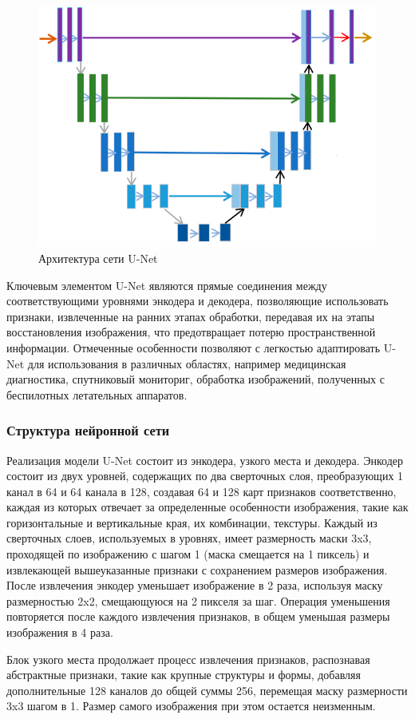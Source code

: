 \begin{figure}[h]
	\centering
	\includegraphics[width=0.7\linewidth]{images/unet}
	\caption{Архитектура сети U-Net}
	\label{fig:unet}
\end{figure}

Ключевым элементом U-Net являются прямые соединения между соответствующими уровнями энкодера и декодера, позволяющие использовать признаки, извлеченные на ранних этапах обработки, передавая их на этапы восстановления изображения, что предотвращает потерю пространственной информации. Отмеченные особенности позволяют с легкостью адаптировать U-Net для использования в различных областях, например медицинская диагностика, спутниковый мониториг, обработка изображений, полученных с беспилотных летательных аппаратов.

\subsubsection{Структура нейронной сети}

Реализация модели U-Net состоит из энкодера, узкого места и декодера. Энкодер состоит из двух уровней, содержащих по два сверточных слоя, преобразующих 1 канал в 64 и 64 канала в 128, создавая 64 и 128 карт признаков соответственно, каждая из которых отвечает за определенные особенности изображения, такие как горизонтальные и вертикальные края, их комбинации, текстуры. Каждый из сверточных слоев, используемых в уровнях, имеет размерность маски 3x3, проходящей по изображению с шагом 1 (маска смещается на 1 пиксель) и извлекающей вышеуказанные признаки с сохранением размеров изображения. После извлечения энкодер уменьшает изображение в 2 раза, используя маску размерностью 2x2, смещающуюся на 2 пикселя за шаг. Операция уменьшения повторяется после каждого извлечения признаков, в общем уменьшая размеры изображения в 4 раза.

Блок узкого места продолжает процесс извлечения признаков, распознавая абстрактные признаки, такие как крупные структуры и формы, добавляя дополнительные 128 каналов до общей суммы 256, перемещая маску размерности 3x3 шагом в 1. Размер самого изображения при этом остается неизменным.


